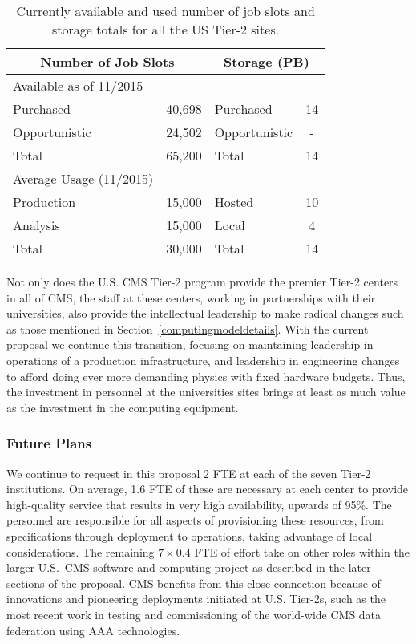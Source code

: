 \documentclass[11pt,a4paper]{article}
\begin{document}
\begin{table}
\begin{center}
\begin{tabular}{|l|c|l|c|}
\hline
\multicolumn{2}{|c|}{Number of Job Slots} &  \multicolumn{2}{|c|}{Storage (PB)} \\ \hline
Available as of 11/2015 &          &               &    \\
Purchased     & 40,698             & Purchased     & 14 \\
Opportunistic & 24,502             & Opportunistic & -  \\
Total         & 65,200             & Total         & 14 \\ \hline
Average Usage (11/2015) &          &               &    \\
Production    & 15,000             & Hosted        & 10 \\
Analysis      & 15,000             & Local         &  4 \\
Total         & 30,000             & Total         & 14 \\ \hline
\end{tabular}
\caption[]
{
Currently available and used number of job slots and storage totals
for all the US Tier-2 sites.
}
\label{current-resources}
\end{center}
\end{table}

Not only does the U.S. CMS Tier-2 program provide the premier Tier-2
centers in all of CMS, the staff at these centers, working in partnerships
with their universities, also provide the intellectual leadership to make
radical changes such as those mentioned in 
Section~\ref{computingmodeldetails}.  With the current proposal we continue
this transition, focusing on maintaining leadership in operations of a
production infrastructure, and leadership in engineering changes to afford
doing ever more demanding physics with fixed hardware budgets.  Thus, the
investment in personnel at the universities sites brings at least as much
value as the investment in the computing equipment.

\subsubsection{Future Plans}

We continue to request in this proposal 2 FTE at each of the seven Tier-2
institutions.  On average, 1.6 FTE of these are necessary at each center to
provide high-quality service that results in very high availability,
upwards of 95\%. The personnel are responsible for all aspects of
provisioning these resources, from specifications through deployment to
operations, taking advantage of local considerations.  The remaining
$7 \times 0.4$ FTE of effort take on other roles within the larger U.S.~CMS
software and computing project as described in the later sections of
the proposal.  CMS benefits from this close connection because of
innovations and pioneering deployments initiated at U.S. Tier-2s, such as the
most recent work in testing and commissioning of the world-wide CMS data
federation using AAA technologies.
\end{document}
